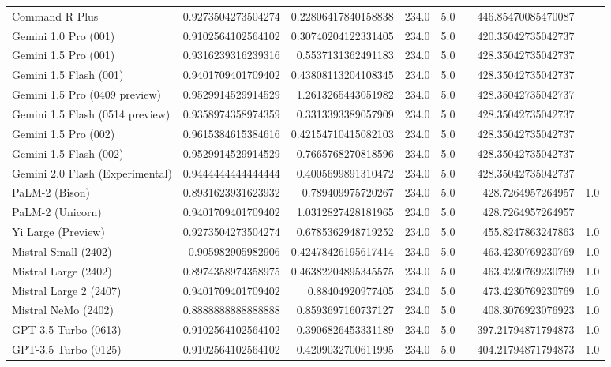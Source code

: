 \begin{table}[htp]
{\begin{tabular}{lrrrrrrr}
Command R Plus & 0.9273504273504274 & 0.22806417840158838 & 234.0 & 5.0 &  & 446.85470085470087 &  \\
Gemini 1.0 Pro (001) & 0.9102564102564102 & 0.30740204122331405 & 234.0 & 5.0 &  & 420.35042735042737 &  \\
Gemini 1.5 Pro (001) & 0.9316239316239316 & 0.5537131362491183 & 234.0 & 5.0 &  & 428.35042735042737 &  \\
Gemini 1.5 Flash (001) & 0.9401709401709402 & 0.43808113204108345 & 234.0 & 5.0 &  & 428.35042735042737 &  \\
Gemini 1.5 Pro (0409 preview) & 0.9529914529914529 & 1.2613265443051982 & 234.0 & 5.0 &  & 428.35042735042737 &  \\
Gemini 1.5 Flash (0514 preview) & 0.9358974358974359 & 0.3313393389057909 & 234.0 & 5.0 &  & 428.35042735042737 &  \\
Gemini 1.5 Pro (002) & 0.9615384615384616 & 0.42154710415082103 & 234.0 & 5.0 &  & 428.35042735042737 &  \\
Gemini 1.5 Flash (002) & 0.9529914529914529 & 0.7665768270818596 & 234.0 & 5.0 &  & 428.35042735042737 &  \\
Gemini 2.0 Flash (Experimental) & 0.9444444444444444 & 0.4005699891310472 & 234.0 & 5.0 &  & 428.35042735042737 &  \\
PaLM-2 (Bison) & 0.8931623931623932 & 0.789409975720267 & 234.0 & 5.0 &  & 428.7264957264957 & 1.0 \\
PaLM-2 (Unicorn) & 0.9401709401709402 & 1.0312827428181965 & 234.0 & 5.0 &  & 428.7264957264957 &  \\
Yi Large (Preview) & 0.9273504273504274 & 0.6785362948719252 & 234.0 & 5.0 &  & 455.8247863247863 & 1.0 \\
Mistral Small (2402) & 0.905982905982906 & 0.42478426195617414 & 234.0 & 5.0 &  & 463.4230769230769 & 1.0 \\
Mistral Large (2402) & 0.8974358974358975 & 0.46382204895345575 & 234.0 & 5.0 &  & 463.4230769230769 & 1.0 \\
Mistral Large 2 (2407) & 0.9401709401709402 & 0.88404920977405 & 234.0 & 5.0 &  & 473.4230769230769 & 1.0 \\
Mistral NeMo (2402) & 0.8888888888888888 & 0.8593697160737127 & 234.0 & 5.0 &  & 408.3076923076923 & 1.0 \\
GPT-3.5 Turbo (0613) & 0.9102564102564102 & 0.3906826453331189 & 234.0 & 5.0 &  & 397.21794871794873 & 1.0 \\
GPT-3.5 Turbo (0125) & 0.9102564102564102 & 0.4209032700611995 & 234.0 & 5.0 &  & 404.21794871794873 & 1.0 \\

\end{tabular}}
\end{table}
